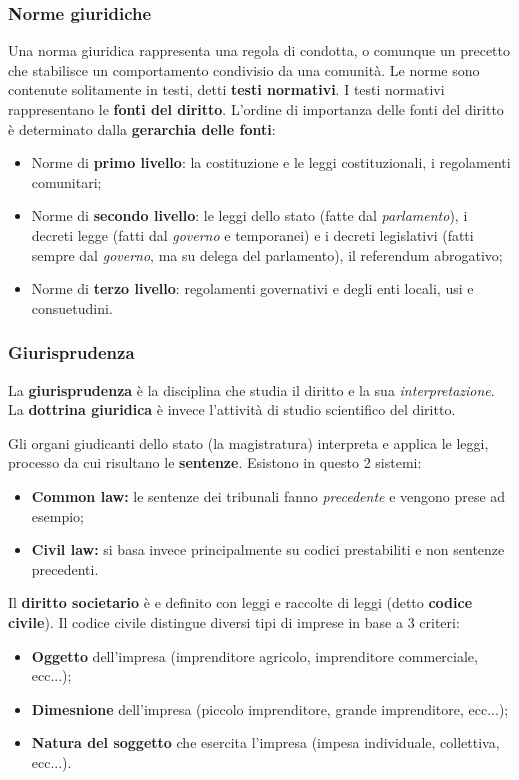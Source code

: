 \documentclass[a4paper,11pt]{article}
\begin{document}
\subsubsection{Norme giuridiche}
Una norma giuridica rappresenta una regola di condotta, o comunque un precetto che stabilisce un comportamento condivisio da una comunità.
Le norme sono contenute solitamente in testi, detti \textbf{testi normativi}.
I testi normativi rappresentano le \textbf{fonti del diritto}.
L'ordine di importanza delle fonti del diritto è determinato dalla \textbf{gerarchia delle fonti}:
\begin{itemize}
	\item Norme di \textbf{primo livello}: la costituzione e le leggi costituzionali, i regolamenti comunitari;
	\item Norme di \textbf{secondo livello}: le leggi dello stato (fatte dal \textit{parlamento}), i decreti legge (fatti dal \textit{governo} e temporanei) e i decreti legislativi (fatti sempre dal \textit{governo}, ma su delega del parlamento), il referendum abrogativo;
	\item Norme di \textbf{terzo livello}: regolamenti governativi e degli enti locali, usi e consuetudini.
\end{itemize}

\subsubsection{Giurisprudenza}
La \textbf{giurisprudenza} è la disciplina che studia il diritto e la sua \textit{interpretazione}.
La \textbf{dottrina giuridica} è invece l'attività di studio scientifico del diritto.

Gli organi giudicanti dello stato (la magistratura) interpreta e applica le leggi, processo da cui risultano le \textbf{sentenze}.
Esistono in questo 2 sistemi:
\begin{itemize}
	\item \textbf{Common law:} le sentenze dei tribunali fanno \textit{precedente} e vengono prese ad esempio;
	\item \textbf{Civil law:} si basa invece principalmente su codici prestabiliti e non sentenze precedenti.
\end{itemize}

Il \textbf{diritto societario} è e definito con leggi e raccolte di leggi (detto \textbf{codice civile}).
Il codice civile distingue diversi tipi di imprese in base a 3 criteri:
\begin{itemize}
	\item \textbf{Oggetto} dell'impresa (imprenditore agricolo, imprenditore commerciale, ecc...);
	\item \textbf{Dimesnione} dell'impresa (piccolo imprenditore, grande imprenditore, ecc...);
	\item \textbf{Natura del soggetto} che esercita l'impresa (impesa individuale, collettiva, ecc...).
\end{itemize}
\end{document}
